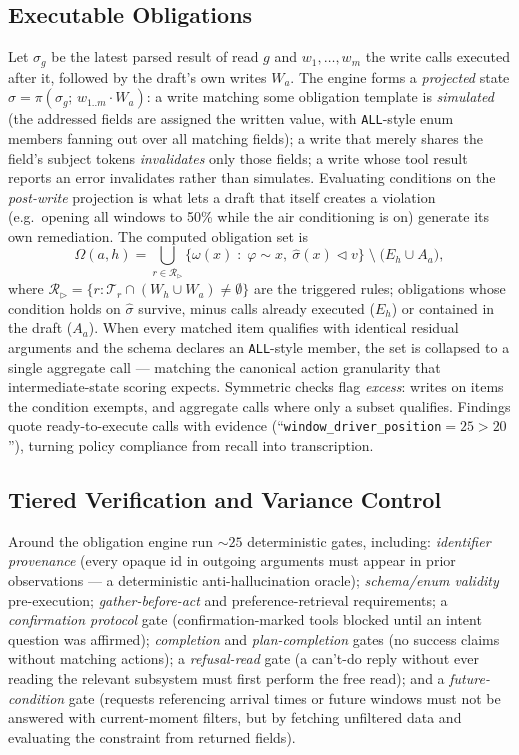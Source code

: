 \documentclass{article}
\newcommand{\act}{\ensuremath{a}}
\newcommand{\hist}{\ensuremath{h}}
\begin{document}
\subsection{Executable Obligations}
\label{sec:oblig}
Let $\sigma_g$ be the latest parsed result of read $g$ and
$w_1,\dots,w_m$ the write calls executed after it, followed by the draft's own
writes $W_\act$. The engine forms a \emph{projected} state
$\hat{\sigma}=\pi(\sigma_g;\,w_{1..m}\!\cdot\!W_\act)$: a write matching some
obligation template is \emph{simulated} (the addressed fields are assigned the
written value, with \texttt{ALL}-style enum members fanning out over all
matching fields); a write that merely shares the field's subject tokens
\emph{invalidates} only those fields; a write whose tool result reports an
error invalidates rather than simulates. Evaluating conditions on the
\emph{post-write} projection is what lets a draft that itself creates a
violation (e.g.\ opening all windows to 50\% while the air conditioning is on)
generate its own remediation. The computed obligation set is
\begin{equation}
\Omega(\act,\hist)=
\bigcup_{r\in\mathcal{R}_{\triangleright}}
\big\{\omega(x)\;:\;\varphi\!\sim\!x,\ \hat{\sigma}(x)\lhd v\big\}
\;\setminus\;\big(E_\hist\cup A_\act\big),
\label{eq:oblig}
\end{equation}
where $\mathcal{R}_{\triangleright}=\{r:\mathcal{T}_r\cap(W_\hist\cup
W_\act)\neq\emptyset\}$ are the triggered rules; obligations whose condition
holds on $\hat{\sigma}$ survive, minus calls already executed ($E_\hist$) or
contained in the draft ($A_\act$). When every matched item qualifies with identical residual
arguments and the schema declares an \texttt{ALL}-style member, the set is
collapsed to a single aggregate call --- matching the canonical action
granularity that intermediate-state scoring expects. Symmetric checks flag
\emph{excess}: writes on items the condition exempts, and aggregate calls
where only a subset qualifies. Findings quote ready-to-execute calls with
evidence (``\texttt{window\_driver\_position}$=25>20$''), turning policy
compliance from recall into transcription.

\subsection{Tiered Verification and Variance Control}
\label{sec:verify}
Around the obligation engine run ${\sim}25$ deterministic gates, including:
\emph{identifier provenance} (every opaque id in outgoing arguments must
appear in prior observations --- a deterministic anti-hallucination oracle);
\emph{schema/enum validity} pre-execution; \emph{gather-before-act} and
preference-retrieval requirements; a \emph{confirmation protocol} gate
(confirmation-marked tools blocked until an intent question was affirmed);
\emph{completion} and \emph{plan-completion} gates (no success claims without
matching actions); a \emph{refusal-read} gate (a can't-do reply without ever
reading the relevant subsystem must first perform the free read); and a
\emph{future-condition} gate (requests referencing arrival times or future
windows must not be answered with current-moment filters, but by fetching
unfiltered data and evaluating the constraint from returned fields).
\end{document}
